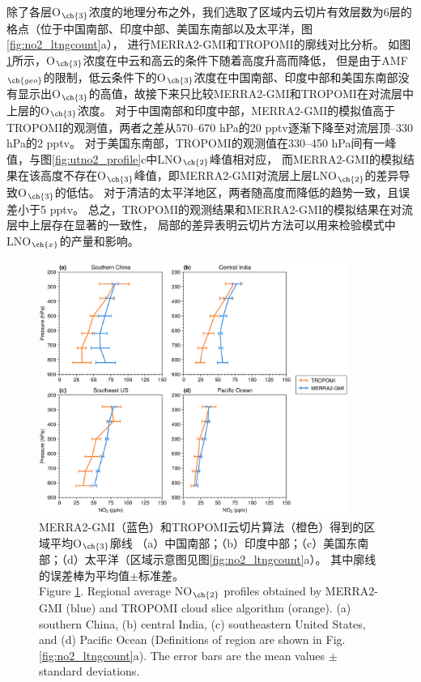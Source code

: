 除了各层O$_{\ch{3}}$浓度的地理分布之外，我们选取了区域内云切片有效层数为6层的格点（位于中国南部、印度中部、美国东南部以及太平洋，图\ref{fig:no2_ltngcount}a），
进行MERRA2-GMI和TROPOMI的廓线对比分析。
如图\ref{fig:uto3_profile}所示，O$_{\ch{3}}$浓度在中云和高云的条件下随着高度升高而降低，
但是由于AMF$_{\ch{geo}}$的限制，低云条件下的O$_{\ch{3}}$浓度在中国南部、印度中部和美国东南部没有显示出O$_{\ch{3}}$的高值，故接下来只比较MERRA2-GMI和TROPOMI在对流层中上层的O$_{\ch{3}}$浓度。
对于中国南部和印度中部，MERRA2-GMI的模拟值高于TROPOMI的观测值，两者之差从570--670 hPa的20 pptv逐渐下降至对流层顶--330 hPa的2 pptv。
对于美国东南部，TROPOMI的观测值在330--450 hPa间有一峰值，与图\ref{fig:utno2_profile}c中LNO$_{\ch{2}}$峰值相对应，
而MERRA2-GMI的模拟结果在该高度不存在O$_{\ch{3}}$峰值，即MERRA2-GMI对流层上层LNO$_{\ch{2}}$的差异导致O$_{\ch{3}}$的低估。
对于清洁的太平洋地区，两者随高度而降低的趋势一致，且误差小于5 pptv。
总之，TROPOMI的观测结果和MERRA2-GMI的模拟结果在对流层中上层存在显著的一致性，
局部的差异表明云切片方法可以用来检验模式中LNO$_{\ch{x}}$的产量和影响。


\begin{figure}[H]
    \centering
    \includegraphics[width=0.9\textwidth]{./figures/uto3_profile.png}
    \caption{
    MERRA2-GMI（蓝色）和TROPOMI云切片算法（橙色）得到的区域平均O$_{\ch{3}}$廓线
    （a）中国南部；（b）印度中部；（c）美国东南部；（d）太平洋（区域示意图见图\ref{fig:no2_ltngcount}a）。
    其中廓线的误差棒为平均值$\pm$标准差。\\
    Figure \ref{fig:uto3_profile}. Regional average NO$_{\ch{2}}$ profiles obtained by MERRA2-GMI (blue) and TROPOMI cloud slice algorithm (orange).
    (a) southern China, (b) central India, (c) southeastern United States, and (d) Pacific Ocean
    (Definitions of region are shown in Fig. \ref{fig:no2_ltngcount}a).
    The error bars are the mean values $\pm$ standard deviations.
    }
    \label{fig:uto3_profile}
\end{figure}

